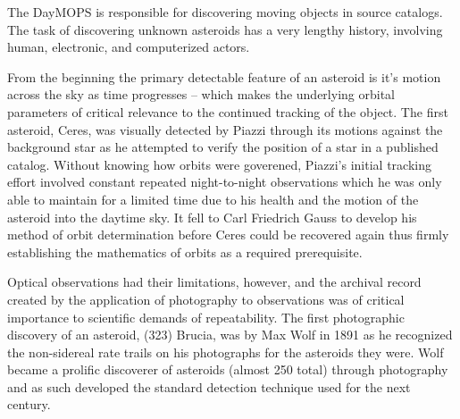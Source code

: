 

The DayMOPS is responsible for discovering moving objects in source
catalogs.  The task of discovering unknown asteroids has a very
lengthy history, involving human, electronic, and computerized actors.

From the beginning the primary detectable feature of an asteroid is
it's motion across the sky as time progresses -- which makes the
underlying orbital parameters of critical relevance to the continued
tracking of the object.  The first asteroid, Ceres, was visually
detected by Piazzi \citep{1802QB378.C4B6.....} through its motions
against the background star as he attempted to verify the position of
a star in a published catalog.  Without knowing how orbits were
goverened, Piazzi's initial tracking effort involved constant repeated
night-to-night observations which he was only able to maintain for a
limited time due to his health and the motion of the asteroid into the
daytime sky.  It fell to Carl Friedrich Gauss to develop his method of
orbit determination before Ceres could be recovered again thus firmly
establishing the mathematics of orbits as a required prerequisite.

Optical observations had their limitations, however, and the archival
record created by the application of photography to observations was
of critical importance to scientific demands of repeatability.  The
first photographic discovery of an asteroid, (323) Brucia, was by Max
Wolf in 1891 \citep{1892AN....129..337W} as he recognized the
non-sidereal rate trails on his photographs for the asteroids they
were.  Wolf became a prolific discoverer of asteroids (almost 250
total) through photography and as such developed the standard
detection technique used for the next century.

